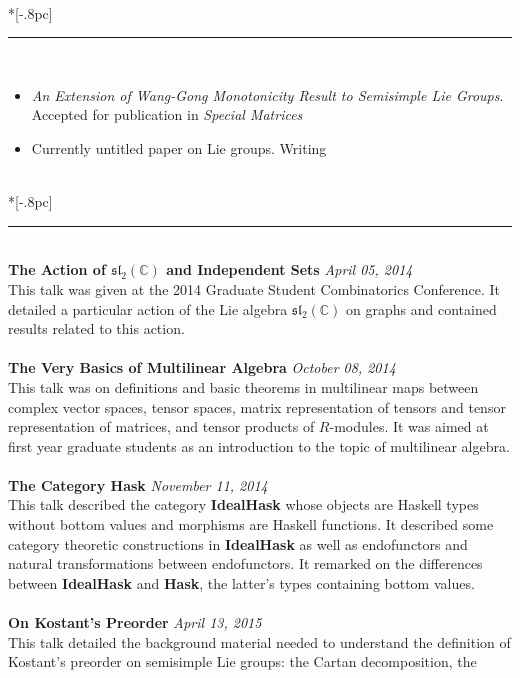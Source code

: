 \documentclass{article}
\begin{document}
 \\*[-.8pc]
\rule{\textwidth}{.1pt} \\
\begin{itemize}[noitemsep]
\item \emph{An Extension of Wang-Gong Monotonicity Result to Semisimple Lie
    Groups}. Accepted for publication in \textit{Special Matrices}
\item Currently untitled paper on Lie groups. Writing
\end{itemize}
\vspace{1ex}
 \\*[-.8pc]
\rule{\textwidth}{.1pt} \\
\textbf{The Action of \( \mathfrak{sl}_2(\mathbb{C}) \) and Independent Sets}
\hfill \textit{April 05, 2014}\\
This talk was given at the 2014 Graduate Student Combinatorics Conference. It
detailed a particular action of the Lie algebra
\( \mathfrak{sl}_2(\mathbb{C}) \)
on graphs and contained results related to this action.
\\ \\
\textbf{The Very Basics of Multilinear Algebra} \hfill \textit{October 08,
  2014}\\
This talk was on
definitions and basic theorems in multilinear maps between complex vector
spaces, tensor spaces, matrix representation of tensors and tensor
representation of matrices, and tensor products of $R$-modules. It was aimed at
first year graduate students as an introduction to the topic of multilinear
algebra.
\\ \\
\textbf{The Category \textup{Hask}} \hfill \textit{November 11, 2014}\\
This talk described the category \textbf{IdealHask} whose objects are Haskell
types without bottom values 
and morphisms are Haskell functions. It described some category theoretic
constructions in \textbf{IdealHask} as well as endofunctors and natural
transformations between endofunctors. It remarked on the differences between
\textbf{IdealHask} and \textbf{Hask}, the latter's types containing bottom
values.
\\ \\
\textbf{On Kostant's Preorder} \hfill \textit{April 13, 2015}\\
This talk detailed the background material needed to understand the definition
of Kostant's preorder on semisimple Lie groups: the Cartan decomposition, the
\end{document}
